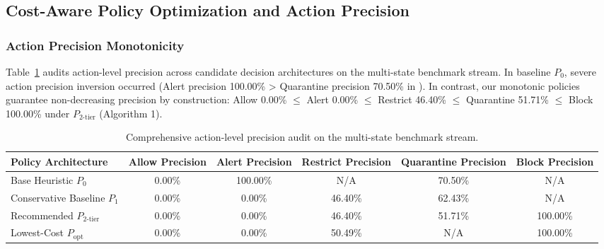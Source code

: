\documentclass[journal,10pt,onecolumn]{IEEEtran}
\begin{document}
\subsection{Cost-Aware Policy Optimization and Action Precision}

\subsubsection{Action Precision Monotonicity}
Table~\ref{tab:action_precision} audits action-level precision across candidate decision architectures on the multi-state benchmark stream. In baseline $P_0$, severe action precision inversion occurred (Alert precision 100.00\% > Quarantine precision 70.50\% in \cite{1}). In contrast, our monotonic policies guarantee non-decreasing precision by construction: Allow 0.00\% $\le$ Alert 0.00\% $\le$ Restrict 46.40\% $\le$ Quarantine 51.71\% $\le$ Block 100.00\% under $P_{2\text{-tier}}$ (Algorithm 1).

\begin{table}[t]
\caption{Comprehensive action-level precision audit on the multi-state benchmark stream.}
\label{tab:action_precision}
\centering
\small
\begin{tabular}{lccccc}
\toprule
\textbf{Policy Architecture} & \textbf{Allow Precision} & \textbf{Alert Precision} & \textbf{Restrict Precision} & \textbf{Quarantine Precision} & \textbf{Block Precision} \\
\midrule
Base Heuristic $P_0$ \cite{1} & 0.00\% & 100.00\% & N/A & 70.50\% & N/A \\
Conservative Baseline $P_1$ & 0.00\% & 0.00\% & 46.40\% & 62.43\% & N/A \\
Recommended $P_{2\text{-tier}}$ & 0.00\% & 0.00\% & 46.40\% & 51.71\% & 100.00\% \\
Lowest-Cost $P_{\text{opt}}$ & 0.00\% & 0.00\% & 50.49\% & N/A & 100.00\% \\
\bottomrule
\end{tabular}
\end{table}
\end{document}
